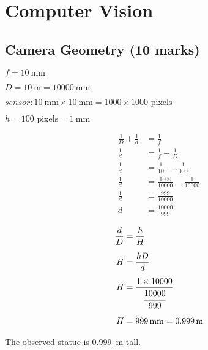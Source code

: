 \section{Computer Vision}

\subsection{Camera Geometry (10 marks)}

$f = \SI{10}{\mm}$

$D = \SI{10}{\m} = \SI{10000}{\mm}$

$sensor: \SI{10}{\mm} \times \SI{10}{\mm} = 1000 \times 1000 \text{ pixels}$

$h = 100 \text{ pixels} = \SI{1}{\mm}$

\begin{multicols}{2}

\begin{align*}
    \frac{1}{D} + \frac{1}{d} &= \frac{1}{f} \\[1.25ex]
    \frac{1}{d} &= \frac{1}{f} - \frac{1}{D} \\[1.25ex]
    \frac{1}{d} &= \frac{1}{10} - \frac{1}{10000} \\[1.25ex]
    \frac{1}{d} &= \frac{1000}{10000} - \frac{1}{10000} \\[1.25ex]
    \frac{1}{d} &= \frac{999}{10000} \\[1.25ex]
    d &= \frac{10000}{999}
\end{align*}

\begin{align*}
    \frac{d}{D} &= \frac{h}{H} \\[1.25ex]
    H &= \frac{hD}{d} \\[1.25ex]
    H &= \frac{1 \times 10000}{\cfrac{10000}{999}} \\[1.25ex]
    H &= \SI{999}{\mm} = \SI{0.999}{\m}
\end{align*}

\end{multicols}

The observed statue is \SI{0.999}{\m} tall.

\bigskip

